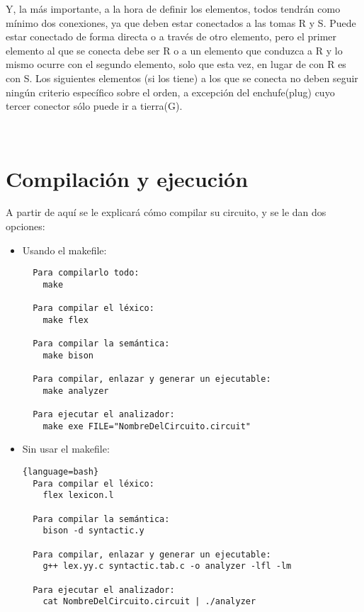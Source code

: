 \documentclass{article}
\begin{document}
Y, la más importante, a la hora de definir los elementos, todos tendrán como mínimo dos conexiones, ya que deben estar conectados a las tomas R y S. Puede estar conectado de forma directa o a través de otro elemento, pero el primer elemento al que se conecta debe ser R o a un elemento que conduzca a R y lo mismo ocurre con el segundo elemento, solo que esta vez, en lugar de con R es con S. Los siguientes elementos (si los tiene) a los que se conecta no deben seguir ningún criterio específico sobre el orden, a excepción del enchufe(plug) cuyo tercer conector sólo puede ir a tierra(G).

\

\section{Compilación y ejecución}

\lstset{style=bash}

A partir de aquí se le explicará cómo compilar su circuito, y se le dan dos opciones:
\begin{itemize}
\item Usando el makefile:
  \begin{lstlisting}
  Para compilarlo todo:
    make

  Para compilar el léxico:
    make flex

  Para compilar la semántica:
    make bison

  Para compilar, enlazar y generar un ejecutable:
    make analyzer

  Para ejecutar el analizador:
    make exe FILE="NombreDelCircuito.circuit"
\end{lstlisting}
\item Sin usar el makefile:
\begin{lstlisting}[basicstyle=\footnotesize]{language=bash}
  Para compilar el léxico:
    flex lexicon.l

  Para compilar la semántica:
    bison -d syntactic.y

  Para compilar, enlazar y generar un ejecutable:
    g++ lex.yy.c syntactic.tab.c -o analyzer -lfl -lm

  Para ejecutar el analizador:
    cat NombreDelCircuito.circuit | ./analyzer

\end{lstlisting}
\end{itemize}
\end{document}
